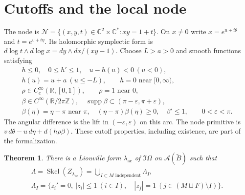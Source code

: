 \documentclass[11pt,a4paper]{article}
\newtheorem{theorem}{Theorem}\newtheorem{lemma}{Lemma}
\newcommand{\cA}{\mathcal A}\newcommand{\sA}{\mathcal A}
\DeclareMathOperator{\Skel}{Skel}\DeclareMathOperator{\Log}{Log}
\begin{document}
\section*{Cutoffs and the local node}
The node is $\mathcal N=\{(x,y,t)\in\mathbb C^2\times\mathbb C^*:xy=1+t\}$.
On $x\ne0$ write $x=e^{u+i\theta}$ and $t=e^{v+i\eta}$.
Its holomorphic symplectic form is
$d\log t\wedge d\log x=dy\wedge dx/(xy-1)$.
Choose $L>a>0$ and smooth functions satisfying
\[
\begin{gathered}
h\le0,\quad 0\le h'\le1,\quad u-h(u)<0\ (u<0),\\
h(u)=u+a\ (u\le-L),\qquad h=0\text{ near }[0,\infty),\\
\rho\in C_c^\infty(\mathbb R,[0,1]),\qquad \rho=1\text{ near }0,\\
\beta\in C^\infty(\mathbb R/2\pi\mathbb Z),\quad
\operatorname{supp}\beta\subset(\pi-\varepsilon,\pi+\varepsilon),\\
\beta(\eta)=\eta-\pi\text{ near }\pi,\quad
(\eta-\pi)\beta(\eta)\ge0,\quad \beta'\le1,
\qquad 0<\varepsilon<\pi.
\end{gathered}
\]
The angular difference is the lift in $(-\varepsilon,\varepsilon)$ on this arc.
The node primitive is $v\,d\theta-u\,d\eta+d(h\rho\beta)$.
These cutoff properties, including existence, are part of the formalization.

\begin{theorem}\label{thm:acyclic-skeleton}
There is a Liouville form $\lambda_{\mathrm{ac}}$ of $\Im\Omega$ on $\cA(\widetilde B)$ such that
\begin{equation}\label{eq:acyclic-skeleton}
 \begin{gathered}
 \Lambda=\Skel(Z_{\lambda_{\mathrm{ac}}})=\bigcup_{I\subset M\text{ independent}}\Lambda_I,\\
 \Lambda_I=\bigl\{z_i'=0,\ |z_i|\le1\ (i\in I),\quad |z_j|=1\ (j\in(M\sqcup F)\setminus I)\bigr\}.
 \end{gathered}
\end{equation}


\end{theorem}
\end{document}
